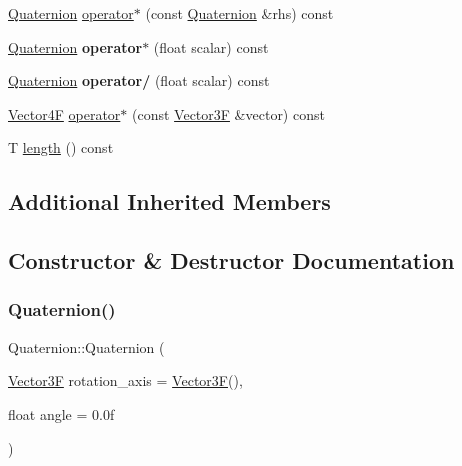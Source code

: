 \begin{DoxyCompactItemize}
\mbox{\hyperlink{class_quaternion}{Quaternion}} \mbox{\hyperlink{class_quaternion_a7cc9bf508bfd8d521a0d246a2cb47194}{operator$\ast$}} (const \mbox{\hyperlink{class_quaternion}{Quaternion}} \&rhs) const
\item 
\mbox{\label{class_quaternion_af19d7a5554539ad967b8c913939dacb6}} 
\mbox{\hyperlink{class_quaternion}{Quaternion}} {\bfseries operator$\ast$} (float scalar) const
\item 
\mbox{\label{class_quaternion_abf1b9fe3ab980e5c97ff0f89c7da9a76}} 
\mbox{\hyperlink{class_quaternion}{Quaternion}} {\bfseries operator/} (float scalar) const
\item 
\mbox{\hyperlink{class_vector4}{Vector4F}} \mbox{\hyperlink{class_quaternion_af0ec7fb0212b1761149d9bd36bf87455}{operator$\ast$}} (const \mbox{\hyperlink{class_vector3}{Vector3F}} \&vector) const
\item 
T \mbox{\hyperlink{class_quaternion_a1c8ab62fe32713c21353d71a1b23b0f2}{length}} () const
\end{DoxyCompactItemize}
\subsection*{Additional Inherited Members}


\subsection{Constructor \& Destructor Documentation}
\mbox{\label{class_quaternion_a2f9345c4e4ea54370b26cce4d5b075c2}} 
\subsubsection{\texorpdfstring{Quaternion()}{Quaternion()}\hspace{0.1cm}{\footnotesize\ttfamily [1/3]}}
{\footnotesize\ttfamily Quaternion\+::\+Quaternion (\begin{DoxyParamCaption}\item[{\mbox{\hyperlink{class_vector3}{Vector3F}}}]{rotation\+\_\+axis = {\ttfamily \mbox{\hyperlink{class_vector3}{Vector3F}}()},  }\item[{float}]{angle = {\ttfamily 0.0f} }\end{DoxyParamCaption})}

